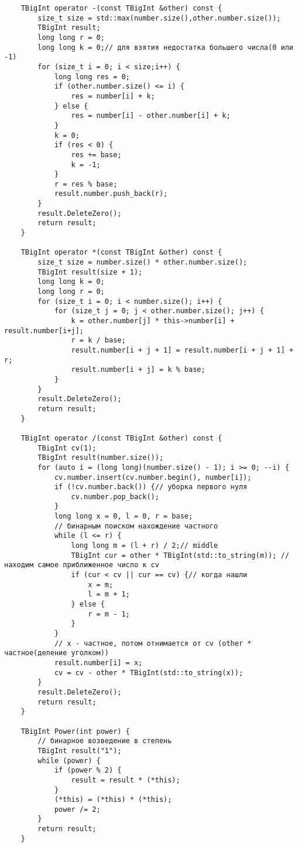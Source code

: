 \documentclass[12pt]{article}
\begin{document}
\begin{verbatim}
    TBigInt operator -(const TBigInt &other) const {
        size_t size = std::max(number.size(),other.number.size());
        TBigInt result;
        long long r = 0;
        long long k = 0;// для взятия недостатка большего числа(0 или -1)
        for (size_t i = 0; i < size;i++) {
            long long res = 0;
            if (other.number.size() <= i) {
                res = number[i] + k;
            } else {
                res = number[i] - other.number[i] + k;
            }
            k = 0;
            if (res < 0) {
                res += base;
                k = -1;
            }
            r = res % base;
            result.number.push_back(r);
        }
        result.DeleteZero();
        return result;
    }

    TBigInt operator *(const TBigInt &other) const {
        size_t size = number.size() * other.number.size();
        TBigInt result(size + 1);
        long long k = 0;
        long long r = 0;
        for (size_t i = 0; i < number.size(); i++) {
            for (size_t j = 0; j < other.number.size(); j++) {
                k = other.number[j] * this->number[i] + result.number[i+j];
                r = k / base;
                result.number[i + j + 1] = result.number[i + j + 1] + r;
                result.number[i + j] = k % base;
            }
        }
        result.DeleteZero();
        return result;
    }

    TBigInt operator /(const TBigInt &other) const {
        TBigInt cv(1);
        TBigInt result(number.size());
        for (auto i = (long long)(number.size() - 1); i >= 0; --i) {
            cv.number.insert(cv.number.begin(), number[i]);
            if (!cv.number.back()) {// уборка первого нуля
                cv.number.pop_back();
            }
            long long x = 0, l = 0, r = base;
            // бинарным поиском нахождение частного
            while (l <= r) {
                long long m = (l + r) / 2;// middle
                TBigInt cur = other * TBigInt(std::to_string(m)); // находим самое приближенное число к cv
                if (cur < cv || cur == cv) {// когда нашли
                    x = m;
                    l = m + 1;
                } else {
                    r = m - 1;
                }
            }   
            // x - частное, потом отнимается от cv (other * частное(деление уголком))
            result.number[i] = x;
            cv = cv - other * TBigInt(std::to_string(x));
        }
        result.DeleteZero();
        return result;
    }

    TBigInt Power(int power) {
        // бинарное возведение в степень
        TBigInt result("1");
        while (power) {
            if (power % 2) {
                result = result * (*this);
            }
            (*this) = (*this) * (*this);
            power /= 2;
        }
        return result;
    }


\end{verbatim}
\end{document}
